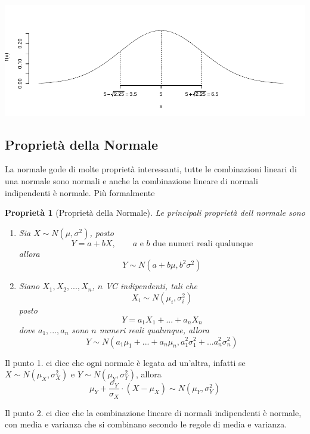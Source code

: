 \documentclass[
  11pt,
]{book}
\providecommand{\tightlist}{%
  \setlength{\itemsep}{0pt}\setlength{\parskip}{0pt}}
\theoremstyle{mytheoremstyle}
\newtheorem{proposition}{Proprietà}[section]
\theoremstyle{mydefstyle}
\begin{document}
\begin{center}\includegraphics{Appunti_di_Statistica_2025_files/figure-latex/07c-Normale-4-1} \end{center}

\subsection{Proprietà della Normale}\label{proprietuxe0-della-normale}

La normale gode di molte proprietà interessanti, tutte le combinazioni lineari di
una normale sono normali e anche la combinazione lineare di normali indipendenti
è normale. Più formalmente

\begin{proposition}[Proprietà della Normale]

Le principali proprietà dell normale sono

\begin{enumerate}
\def\labelenumi{\arabic{enumi}.}
\tightlist
\item
  Sia \(X\sim N(\mu,\sigma^2)\), posto
  \[Y=a+bX,\qquad\text{$a$ e $b$ due numeri reali qualunque}\]
  allora
  \[Y\sim N(a+b\mu,b^2\sigma^2)\]
\item
  Siano \(X_1, X_2,...,X_n\), \(n\) VC indipendenti, tali che
  \[X_i\sim N(\mu_i,\sigma_i^2)\]
  posto
  \[Y=a_1X_1+...+a_nX_n\]
  dove \(a_1,...,a_n\) sono \(n\) numeri reali qualunque, allora
  \[Y\sim N(a_1\mu_1+...+a_n\mu_n,a_1^2\sigma_1^2+...a_n^2\sigma_n^2)\]
\end{enumerate}

\end{proposition}

Il punto 1. ci dice che ogni normale è legata ad un'altra, infatti se \(X\sim N(\mu_X,\sigma_X^2)\) e \(Y\sim N(\mu_Y,\sigma_Y^2)\), allora
\[
\mu_Y+\frac{\sigma_Y}{\sigma_X}\cdot (X-\mu_X)\sim N(\mu_Y,\sigma_Y^2)
\]

Il punto 2. ci dice che la combinazione lineare di normali indipendenti è normale,
con media e varianza che si combinano secondo le regole di media e varianza.
\end{document}
